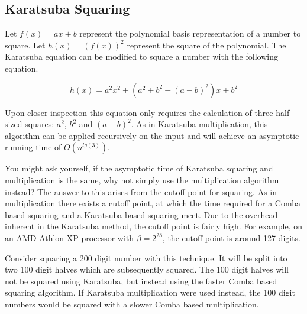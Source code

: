 \documentclass[b5paper]{book}
\begin{document}
\subsection{Karatsuba Squaring}
Let $f(x) = ax + b$ represent the polynomial basis representation of a number to square.  
Let $h(x) = \left ( f(x) \right )^2$ represent the square of the polynomial.  The Karatsuba equation can be modified to square a 
number with the following equation.

\begin{equation}
h(x) = a^2x^2 + \left (a^2 + b^2 - (a - b)^2 \right )x + b^2
\end{equation}

Upon closer inspection this equation only requires the calculation of three half-sized squares: $a^2$, $b^2$ and $(a - b)^2$.  As in 
Karatsuba multiplication, this algorithm can be applied recursively on the input and will achieve an asymptotic running time of 
$O \left ( n^{lg(3)} \right )$.

You might ask yourself, if the asymptotic time of Karatsuba squaring and multiplication is the same, why not simply use the multiplication algorithm 
instead?  The answer to this arises from the cutoff point for squaring.  As in multiplication there exists a cutoff point, at which the 
time required for a Comba based squaring and a Karatsuba based squaring meet.  Due to the overhead inherent in the Karatsuba method, the cutoff 
point is fairly high.  For example, on an AMD Athlon XP processor with $\beta = 2^{28}$, the cutoff point is around 127 digits.  

Consider squaring a 200 digit number with this technique.  It will be split into two 100 digit halves which are subsequently squared.  
The 100 digit halves will not be squared using Karatsuba, but instead using the faster Comba based squaring algorithm.  If Karatsuba multiplication
were used instead, the 100 digit numbers would be squared with a slower Comba based multiplication.  
\end{document}
